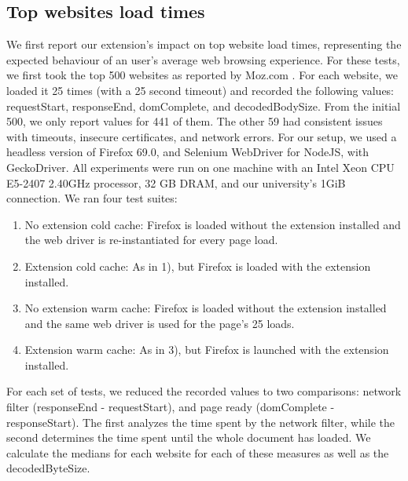 \subsection{Top websites load times} \label{top_sites}
We first report our extension's impact on top website load times, representing the expected behaviour of an user's average web browsing experience. For these tests, we first took the top 500 websites as reported by Moz.com \cite{top500}. For each website, we loaded it 25 times (with a 25 second timeout) and recorded the following values: requestStart, responseEnd, domComplete, and decodedBodySize. From the initial 500, we only report values for 441 of them. The other 59 had consistent issues with timeouts, insecure certificates, and network errors. For our setup, we used a headless version of Firefox 69.0, and Selenium WebDriver for NodeJS, with GeckoDriver. All experiments were run on one machine with an Intel Xeon CPU E5-2407 2.40GHz processor, 32 GB DRAM, and our university's 1GiB connection. We ran four test suites:
\begin{enumerate}
	\item No extension cold cache: Firefox is loaded without the extension installed and the web driver is re-instantiated for every page load.
	\item Extension cold cache: As in 1), but Firefox is loaded with the extension installed.
	\item No extension warm cache: Firefox is loaded without the extension installed and the same web driver is used for the page's 25 loads.
	\item Extension warm cache: As in 3), but Firefox is launched with the extension installed.
\end{enumerate}


For each set of tests, we reduced the recorded values to two comparisons: network filter (responseEnd - requestStart), and page ready (domComplete - responseStart). The first analyzes the time spent by the network filter, while the second determines the time spent until the whole document has loaded. We calculate the medians for each website for each of these measures as well as the decodedByteSize.

